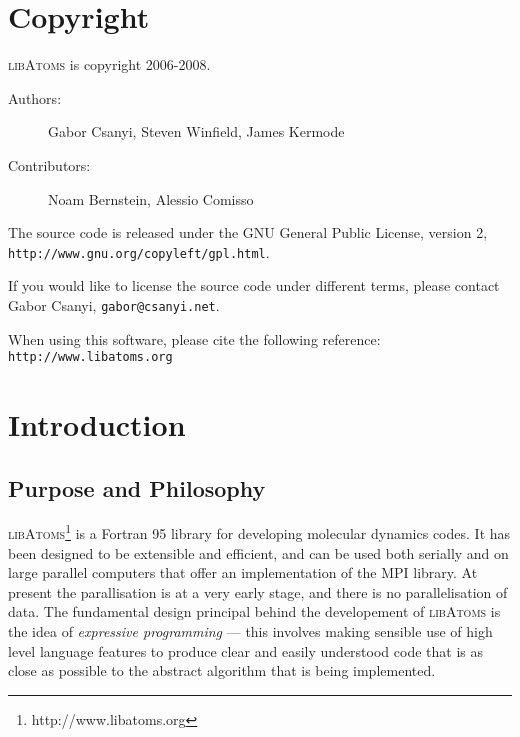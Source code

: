 
\section{Copyright}

\textsc{libAtoms} is copyright 2006-2008.

\begin{description}
\item[Authors:] Gabor Csanyi, Steven Winfield, James Kermode
\item[Contributors:] Noam Bernstein, Alessio Comisso
\end{description}

The source code is released under the GNU General Public License,
version 2, \\ \texttt{http://www.gnu.org/copyleft/gpl.html}.

If you would like to license the source code under different terms,
please contact Gabor Csanyi, \texttt{gabor@csanyi.net}.

When using this software, please cite the following reference:
\texttt{http://www.libatoms.org}

\section{Introduction}

\subsection*{Purpose and Philosophy}

\textsc{libAtoms}\footnote{http://www.libatoms.org} is a Fortran 95
library for developing molecular dynamics codes. It has been designed
to be extensible and efficient, and can be used both serially and on
large parallel computers that offer an implementation of the MPI
library. At present the parallisation is at a very early stage, and
there is no parallelisation of data. The fundamental design principal
behind the developement of \textsc{libAtoms} is the idea of
\emph{expressive programming} --- this involves making sensible use of
high level language features to produce clear and easily understood
code that is as close as possible to the abstract algorithm that is
being implemented.

